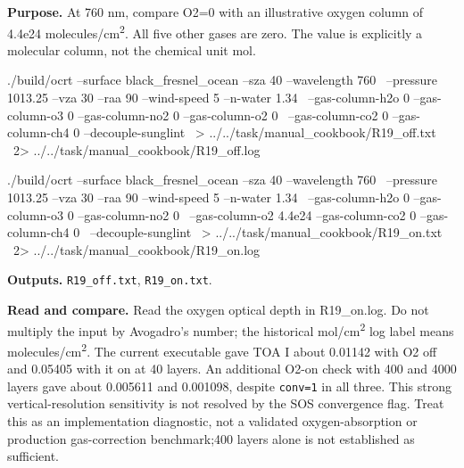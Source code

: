 \label{recipe:R19}

\textbf{Purpose. }At 760 nm, compare O2=0 with an illustrative oxygen column of 4.4e24 molecules/cm\textsuperscript{2}. All five other gases are zero. The value is explicitly a molecular column, not the chemical unit mol.

\noindent\begin{minipage}{\linewidth}
\begin{ManualCode}

./build/ocrt --surface black_fresnel_ocean --sza 40 --wavelength 760 \
  --pressure 1013.25 --vza 30 --raa 90 --wind-speed 5 --n-water 1.34 \
  --gas-column-h2o 0 --gas-column-o3 0 --gas-column-no2 0 --gas-column-o2 0 \
  --gas-column-co2 0 --gas-column-ch4 0 --decouple-sunglint \
  > ../../task/manual_cookbook/R19_off.txt \
  2> ../../task/manual_cookbook/R19_off.log

\end{ManualCode}
\end{minipage}\par

\noindent\begin{minipage}{\linewidth}
\begin{ManualCode}

./build/ocrt --surface black_fresnel_ocean --sza 40 --wavelength 760 \
  --pressure 1013.25 --vza 30 --raa 90 --wind-speed 5 --n-water 1.34 \
  --gas-column-h2o 0 --gas-column-o3 0 --gas-column-no2 0 \
  --gas-column-o2 4.4e24 --gas-column-co2 0 --gas-column-ch4 0 \
  --decouple-sunglint \
  > ../../task/manual_cookbook/R19_on.txt \
  2> ../../task/manual_cookbook/R19_on.log

\end{ManualCode}
\end{minipage}\par

\textbf{Outputs. }\texttt{R19\_\allowbreak{}off.txt}, \texttt{R19\_\allowbreak{}on.txt}.

\textbf{Read and compare. }Read the oxygen optical depth in R19\_on.log. Do not multiply the input by Avogadro's number; the historical mol/cm\textsuperscript{2} log label means molecules/cm\textsuperscript{2}. The current executable gave TOA I about 0.01142 with O2 off and 0.05405 with it on at 40 layers. An additional O2-on check with 400 and 4000 layers gave about 0.005611 and 0.001098, despite \texttt{conv=\allowbreak{}1} in all three. This strong vertical-resolution sensitivity is not resolved by the SOS convergence flag. Treat this as an implementation diagnostic, not a validated oxygen-absorption or production gas-correction benchmark;400 layers alone is not established as sufficient.

